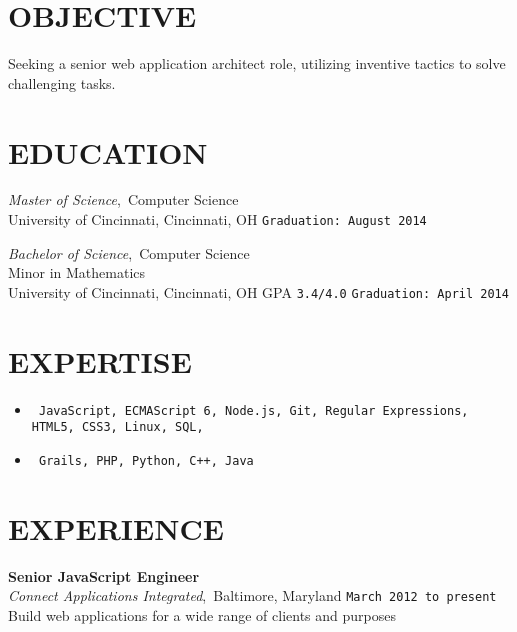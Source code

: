 \documentclass[11pt, line]{res}
\begin{document}
	\address{8228 Melrose Ln\\ Maineville, OH 45039\\ 513-259-0656\\ ross@rhadden.com}

	\begin{resume}
		\vspace{-16pt}
		\section{OBJECTIVE}
			Seeking a senior web application architect role, utilizing inventive tactics to solve challenging tasks.

		\section{EDUCATION}
				\textit{Master of Science},\, Computer Science \\
				University of Cincinnati, Cincinnati, OH
					\hfill \texttt{Graduation: August 2014}

			\vspace{-2pt}
				\textit{Bachelor of Science},\, Computer Science \\
				Minor in Mathematics \\
				University of Cincinnati, Cincinnati, OH
					\hspace{16pt} GPA \texttt{3.4/4.0}
					\hfill \texttt{Graduation: April 2014}

		\section{EXPERTISE}
			\begin{itemize}[leftmargin=0pt]
				\item[]
				\texttt{
					JavaScript,
					ECMAScript 6,
					Node.js,
					Git,
					Regular Expressions,
					HTML5,
					CSS3,
					Linux,
					SQL,
				}
				\item[]
				\texttt{
					Grails,
					PHP,
					Python,
					C++,
					Java
				}
			\end{itemize}

		\section{EXPERIENCE}
				\textbf{Senior JavaScript Engineer} \\
				\textit{Connect Applications Integrated},\, Baltimore, Maryland
					\hfill \texttt{March 2012 to present} \\
				Build web applications for a wide range of clients and purposes


\end{resume}
\end{document}
